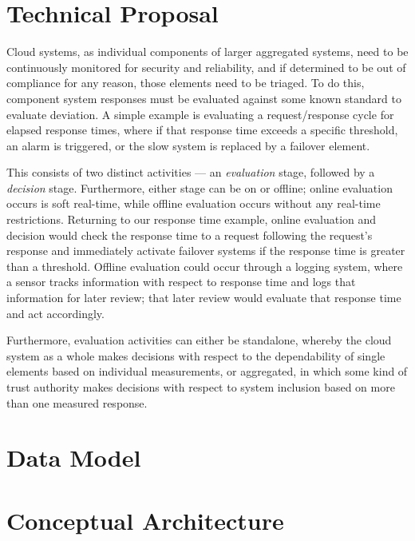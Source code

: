 \section{Technical Proposal}
Cloud systems, as individual components of larger aggregated systems, need to be continuously monitored for security and reliability, and if determined to be out of compliance for any reason, those elements need to be triaged.  To do this, component system responses must be evaluated against some known standard to evaluate deviation.  A simple example is evaluating a request/response cycle for elapsed response times, where if that response time exceeds a specific threshold, an alarm is triggered, or the slow system is replaced by a failover element.

This consists of two distinct activities --- an \textit{evaluation} stage, followed by a \textit{decision} stage.  Furthermore, either stage can be on or offline; online evaluation occurs is soft real-time, while offline evaluation occurs without any real-time restrictions.  Returning to our response time example, online evaluation and decision would check the response time to a request following the request's response and immediately activate failover systems if the response time is greater than a threshold.  Offline evaluation could occur through a logging system, where a sensor tracks information with respect to response time and logs that information for later review; that later review would evaluate that response time and act accordingly.

Furthermore, evaluation activities can either be standalone, whereby the cloud system as a whole makes decisions with respect to the dependability of single elements based on individual measurements, or aggregated, in which some kind of trust authority makes decisions with respect to system inclusion based on more than one measured response.

\section{Data Model}

\section{Conceptual Architecture}
